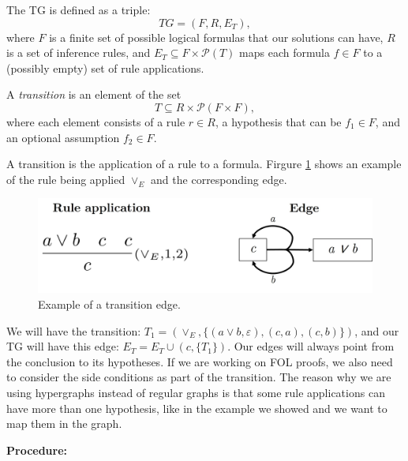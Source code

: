 \documentclass[runningheads]{llncs}
\begin{document}
\begin{definition}
The TG is defined as a triple:
\[
TG = (F, R, E_T),
\]
where \( F \) is a finite set of possible logical formulas that our solutions can have, \( R \) is a set of inference rules, and \(E_T \subseteq F \times \mathcal{P}(T)\) maps each formula \( f \in F \) to a (possibly empty) set of rule applications.
\end{definition}

\begin{definition}
A \emph{transition} is an element of the set
\[
T \subseteq R \times \mathcal{P}(F \times F),
\]
where each element consists of a rule \( r \in R \), a hypothesis that can be \( f_1 \in F \), and an optional assumption \( f_2 \in F \).
\end{definition}


A transition is the application of a rule to a formula. Firgure \ref{fig:te-ex} shows an example of the rule being applied \(\vee_E\) and the corresponding edge.
\vspace{-1em}
    \begin{figure}[H]
        \centering
        \includegraphics[width=0.8\linewidth]{resources/te-example.jpg}
        \caption{Example of a transition edge.}
        \label{fig:te-ex}
    \end{figure}
\vspace{-2em}

We will have the transition: \(T_1 = (\vee_E, \{(a \vee b, \varepsilon), (c, a), (c, b)\})\), and our TG will have this edge: \(E_T = E_T \cup (c, \{T_1\})\). Our edges will always point from the conclusion to its hypotheses. If we are working on FOL proofs, we also need to consider the side conditions as part of the transition. The reason why we are using hypergraphs instead of regular graphs is that some rule applications can have more than one hypothesis, like in the example we showed and we want to map them in the graph.

\vspace{1em}
\textbf{Procedure: }
\end{document}
